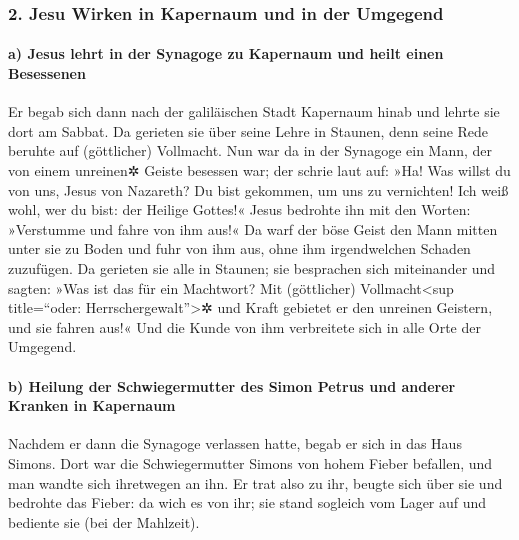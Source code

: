 \hypertarget{jesu-wirken-in-kapernaum-und-in-der-umgegend}{%
\subsubsection{2. Jesu Wirken in Kapernaum und in der
Umgegend}\label{jesu-wirken-in-kapernaum-und-in-der-umgegend}}

\hypertarget{a-jesus-lehrt-in-der-synagoge-zu-kapernaum-und-heilt-einen-besessenen}{%
\paragraph{a) Jesus lehrt in der Synagoge zu Kapernaum und heilt einen
Besessenen}\label{a-jesus-lehrt-in-der-synagoge-zu-kapernaum-und-heilt-einen-besessenen}}

 Er begab sich dann nach der galiläischen Stadt Kapernaum
hinab und lehrte sie dort am Sabbat.  Da gerieten sie
über seine Lehre in Staunen, denn seine Rede beruhte auf (göttlicher)
Vollmacht.  Nun war da in der Synagoge ein Mann, der von
einem unreinen✲ Geiste besessen war; der schrie laut auf:
 »Ha! Was willst du von uns, Jesus von Nazareth? Du bist
gekommen, um uns zu vernichten! Ich weiß wohl, wer du bist: der Heilige
Gottes!«  Jesus bedrohte ihn mit den Worten: »Verstumme
und fahre von ihm aus!« Da warf der böse Geist den Mann mitten unter sie
zu Boden und fuhr von ihm aus, ohne ihm irgendwelchen Schaden zuzufügen.
 Da gerieten sie alle in Staunen; sie besprachen sich
miteinander und sagten: »Was ist das für ein Machtwort? Mit (göttlicher)
Vollmacht\textless sup title=``oder: Herrschergewalt''\textgreater✲ und
Kraft gebietet er den unreinen Geistern, und sie fahren aus!«
 Und die Kunde von ihm verbreitete sich in alle Orte der
Umgegend.

\hypertarget{b-heilung-der-schwiegermutter-des-simon-petrus-und-anderer-kranken-in-kapernaum}{%
\paragraph{b) Heilung der Schwiegermutter des Simon Petrus und anderer
Kranken in
Kapernaum}\label{b-heilung-der-schwiegermutter-des-simon-petrus-und-anderer-kranken-in-kapernaum}}

 Nachdem er dann die Synagoge verlassen hatte, begab er
sich in das Haus Simons. Dort war die Schwiegermutter Simons von hohem
Fieber befallen, und man wandte sich ihretwegen an ihn. 
Er trat also zu ihr, beugte sich über sie und bedrohte das Fieber: da
wich es von ihr; sie stand sogleich vom Lager auf und bediente sie (bei
der Mahlzeit).

